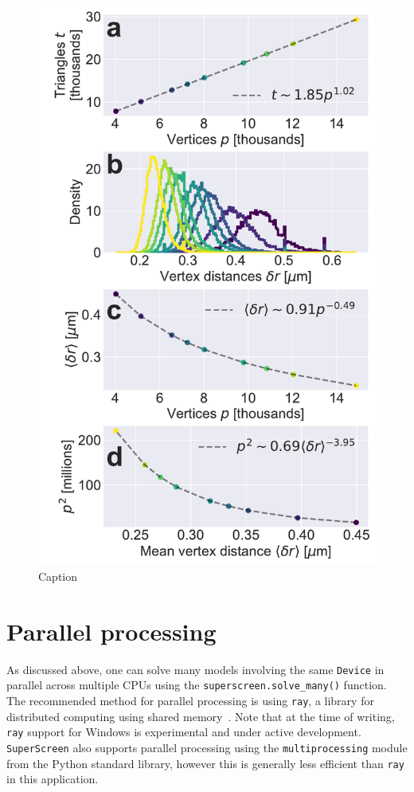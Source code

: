 \documentclass[final,3p,times,twocolumn]{elsarticle}
\newcommand{\inline}[1]{\texttt{#1}\xspace}
\newcommand{\SuperScreen}{\inline{SuperScreen}}
\begin{document}
\begin{figure}
    \centering
    \includegraphics[width=\linewidth]{examples/images/scaling.pdf}
    \caption{Caption}
    \label{fig:scaling}
\end{figure}

\section{Parallel processing}
\label{section:parallel}
As discussed above, one can solve many models involving the same \inline{Device} in parallel across multiple CPUs using the \inline{superscreen.solve_many()} function. The recommended method for parallel processing is using \inline{ray}, a library for distributed computing using shared memory~\cite{Moritz2018-mt}. Note that at the time of writing, \inline{ray} support for Windows is experimental and under active development. \SuperScreen also supports parallel processing using the \inline{multiprocessing} module from the Python standard library, however this is generally less efficient than \inline{ray} in this application.
\end{document}
